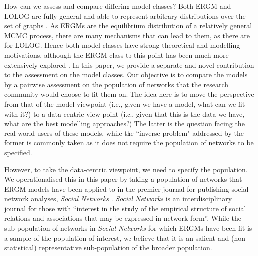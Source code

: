 \documentclass[
]{statsoc}
\begin{document}
How can we assess and compare differing model classes? Both ERGM and
LOLOG are fully general and able to represent arbitrary distributions
over the set of graphs \citep[][Theorem 1]{Fellows2018}. As ERGMs are
the equilibrium distribution of a relatively general MCMC process, there
are many mechanisms that can lead to them, as there are for LOLOG. Hence
both model classes have strong theoretical and modelling motivations,
although the ERGM class to this point has been much more extensively
explored \citep{schweinberger2020,Schweinberger2017ExponentialFamilyMO}.
In this paper, we provide a separate and novel contribution to the
assessment on the model classes. Our objective is to compare the models
by a pairwise assessment on the population of networks that the research
community would choose to fit them on. The idea here is to move the
perspective from that of the model viewpoint (i.e., given we have a
model, what can we fit with it?) to a data-centric view point (i.e.,
given that this is the data we have, what are the best modelling
approaches?) The latter is the question facing the real-world users of
these models, while the ``inverse problem" addressed by the former is
commonly taken as it does not require the population of networks to be
specified.

However, to take the data-centric viewpoint, we need to specify the
population. We operationalised this in this paper by taking a population
of networks that ERGM models have been applied to in the premier journal
for publishing social network analyses, \textit{Social Networks}
\citep{socialnetworks}. \textit{Social Networks} is an interdisciplinary
journal for those with ``interest in the study of the empirical
structure of social relations and associations that may be expressed in
network form''. While the sub-population of networks in
\textit{Social Networks} for which ERGMs have been fit is a sample of
the population of interest, we believe that it is an salient and
(non-statistical) representative sub-population of the broader
population.
\end{document}
